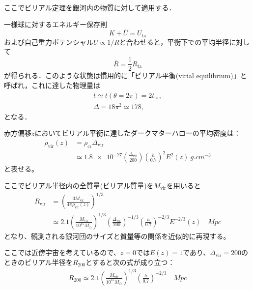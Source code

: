 ここでビリアル定理を銀河内の物質に対して適用する．

一様球に対するエネルギー保存則
\begin{equation}
	K + \overline{U} = U_\text{ta}
\end{equation}
および自己重力ポテンシャル$U \propto 1/R$と合わせると，平衡下での平均半径に対して
\begin{equation}
	\overline{R} = \frac{1}{2}R_\text{ta}
\end{equation}
が得られる．このような状態は慣用的に「ビリアル平衡(virial equilibrium)」と呼ばれ，これに達した物理量は
\begin{align}
	\overline{t} \simeq t(\theta = 2\pi) = 2t_\text{ta},\\
	\overline{\Delta} = 18 \pi^2 \simeq 178,
\end{align}
となる．

赤方偏移$z$においてビリアル平衡に達したダークマターハローの平均密度は：
\begin{align}
	\rho_\text{vir}(z) &= \rho_\text{cr} \Delta_\text{vir} \\
	&\simeq \num{1.8e-27} \left( \frac{\Delta_\text{vir}}{200}\right) \left(\frac{h}{0.7}\right)^2 E^2(z) \ \si{g. cm^{-3}}
\end{align}
と表せる。

ここでビリアル半径内の全質量(ビリアル質量)を$M_\text{vir}$を用いると
\begin{align}
	R_\text{vir} &= \left( \frac{3 M_\text{vir}}{4 \pi \rho_\text{vir}(z)} \right)^{1/3} \\
	&\simeq 2.1 \left( \frac{M_\text{vir}}{10^{15} M_\odot} \right)^{1/3} \left( \frac{\Delta_\text{vir}}{200} \right)^{-1/3} \left( \frac{h}{0.7} \right)^{-2/3} E^{-2/3}(z) \quad \si{Mpc}
\end{align}
となり、観測される銀河団のサイズと質量等の関係を近似的に再現する。

ここでは近傍宇宙を考えているので、$z=0$では$E(z) = 1$であり、$\Delta_\text{vir} = 200$のときのビリアル半径を$R_{200}$とすると次の式が成り立つ：
\begin{align}
	R_{200} \simeq 2.1 \left( \frac{M_\text{vir}}{10^{15} M_\odot} \right)^{1/3} \left( \frac{h}{0.7} \right)^{-2/3} \quad \si{Mpc}
\end{align}


